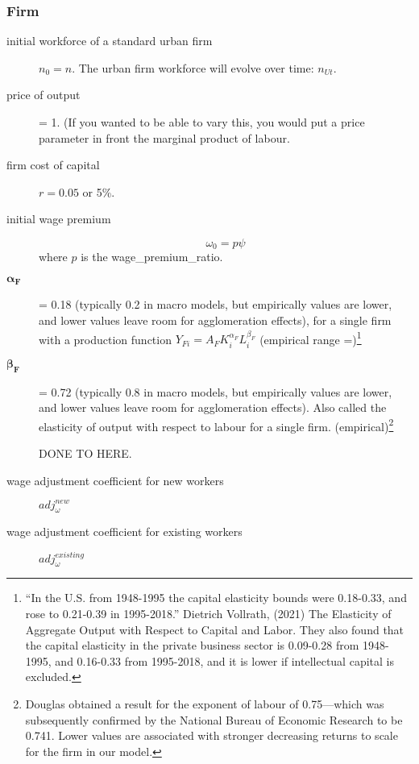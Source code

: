 \subsubsection{Firm}
\begin{description}
\item [initial workforce of a standard urban firm] $n_0=n$.  The urban firm workforce will evolve over time: $n_{Ut}$. 

\item [price of output] = 1. (If you wanted to be able to vary this, you would put a price parameter in front the %
\gls{marginal product of labour}. %

\item [firm cost of capital] $r = 0.05$ or 5\%.

\item [initial wage premium ]  \[\omega_0 = p \psi\] where $p$ is the wage_premium_ratio.




\item  [$\mathbf{\alpha_F}$] = 0.18 (typically 0.2 in macro models, but empirically values are lower, and lower values leave room for agglomeration effects),  for a single firm with a production function $Y_{Fi}=A_F K_i^{\alpha_F }L^{\beta_F}_i$ (empirical range =)\footnote{``In the U.S. from 1948-1995 the capital elasticity bounds were 0.18-0.33, and rose to 0.21-0.39 in 1995-2018.'' Dietrich Vollrath, (2021) The Elasticity of Aggregate Output with Respect to Capital and Labor. They also found that the capital elasticity in the private business sector is 0.09-0.28 from 1948-1995, and 0.16-0.33 from 1995-2018, and it is lower if intellectual capital is excluded.}

\item  [$\mathbf{\beta_F}$] = 0.72 (typically 0.8 in macro models, but empirically values are lower, and lower values leave room for agglomeration effects). Also called the elasticity of output with respect to labour for a single firm. (empirical)\footnote{Douglas  obtained a result for the exponent of labour of 0.75—which was subsequently confirmed by the National Bureau of Economic Research to be 0.741. Lower values  are associated with stronger decreasing returns to scale for the firm in our model.} 

DONE TO HERE.

\item [wage adjustment coefficient for new workers ] $adj^{new}_\omega$

\item [wage adjustment coefficient for existing workers] $adj^{existing}_\omega$
\end{description}


